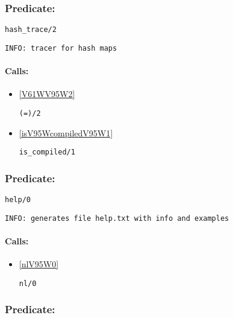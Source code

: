 \subsubsection{Predicate:} \label{hashV95WtraceV95W2}

\begin{verbatim}
hash_trace/2
\end{verbatim}

{\small \begin{verbatim}
INFO: tracer for hash maps

\end{verbatim}}
\paragraph{Calls:} 
\begin{itemize}
\item \ref{V61WV95W2} 
\begin{verbatim}
(=)/2
\end{verbatim}

\item \ref{isV95WcompiledV95W1} 
\begin{verbatim}
is_compiled/1
\end{verbatim}

\end{itemize}

\subsubsection{Predicate:} \label{helpV95W0}

\begin{verbatim}
help/0
\end{verbatim}

{\small \begin{verbatim}
INFO: generates file help.txt with info and examples

\end{verbatim}}
\paragraph{Calls:} 
\begin{itemize}
\item \ref{nlV95W0} 
\begin{verbatim}
nl/0
\end{verbatim}

\end{itemize}

\subsubsection{Predicate:} \label{helpV95W1}

